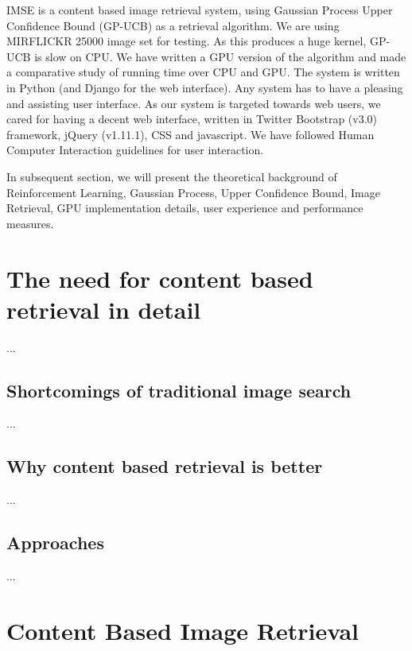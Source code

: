 \documentclass[english]{tktltiki}
\begin{document}
IMSE is a content based image retrieval system, using Gaussian Process Upper Confidence Bound (GP-UCB) as a retrieval algorithm. We are using MIRFLICKR 25000 \cite{mirflickr} image set for testing. As this produces a huge kernel, GP-UCB is slow on CPU. We have written a GPU version of the algorithm and made a comparative study of running time over CPU and GPU. The system is written in Python (and Django for the web interface). Any system has to have a pleasing and assisting user interface. As our system is targeted towards web users, we cared for having a decent web interface, written in Twitter Bootstrap (v3.0) framework, jQuery (v1.11.1), CSS and javascript. We have followed Human Computer Interaction guidelines for user interaction.

In subsequent section, we will present the theoretical background of Reinforcement Learning, Gaussian Process, Upper Confidence Bound, Image Retrieval, GPU implementation details, user experience and performance measures.


\section{The need for content based retrieval in detail}

...

\subsection{Shortcomings of traditional image search}

...

\subsection{Why content based retrieval is better}


...


\subsection{Approaches}

...

\fi


\section{Content Based Image Retrieval}
\end{document}
